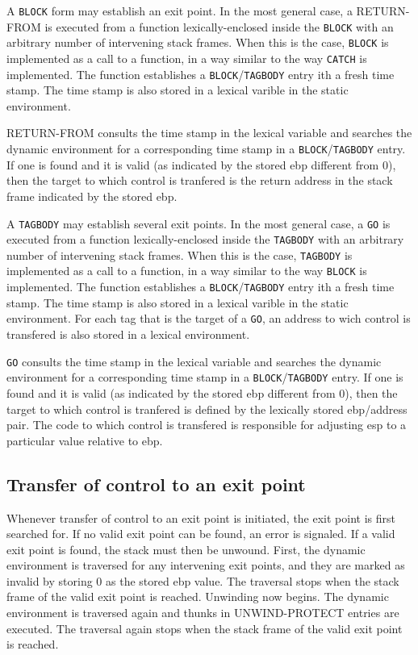 A \texttt{BLOCK} form may establish an exit point.  In the most
general case, a RETURN-FROM is executed from a function
lexically-enclosed inside the \texttt{BLOCK} with an arbitrary number
of intervening stack frames.  When this is the case, \texttt{BLOCK} is
implemented as a call to a function, in a way similar to the way
\texttt{CATCH} is implemented.  The function establishes a
\texttt{BLOCK}/\texttt{TAGBODY} entry ith a fresh time stamp.  The
time stamp is also stored in a lexical varible in the static
environment.

RETURN-FROM consults the time stamp in the lexical variable and
searches the dynamic environment for a corresponding time stamp in a
\texttt{BLOCK}/\texttt{TAGBODY} entry.  If one is found and it is
valid (as indicated by the stored ebp different from 0), then the
target to which control is tranfered is the return address in the
stack frame indicated by the stored ebp.

A \texttt{TAGBODY} may establish several exit points.  In the most
general case, a \texttt{GO} is executed from a function
lexically-enclosed inside the \texttt{TAGBODY} with an arbitrary
number of intervening stack frames.  When this is the case,
\texttt{TAGBODY} is implemented as a call to a function, in a way
similar to the way \texttt{BLOCK} is implemented.  The function
establishes a \texttt{BLOCK}/\texttt{TAGBODY} entry ith a fresh time
stamp.  The time stamp is also stored in a lexical varible in the
static environment.  For each tag that is the target of a \texttt{GO},
an address to wich control is transfered is also stored in a lexical
environment.

\texttt{GO} consults the time stamp in the lexical variable and
searches the dynamic environment for a corresponding time stamp in a
\texttt{BLOCK}/\texttt{TAGBODY} entry.  If one is found and it is
valid (as indicated by the stored ebp different from 0), then the
target to which control is tranfered is defined by the lexically
stored ebp/address pair.  The code to which control is transfered is
responsible for adjusting esp to a particular value relative to ebp.

\subsection{Transfer of control to an exit point}

Whenever transfer of control to an exit point is initiated, the exit
point is first searched for.  If no valid exit point can be found, an
error is signaled.  If a valid exit point is found, the stack must
then be unwound.  First, the dynamic environment is traversed for any
intervening exit points, and they are marked as invalid by storing 0
as the stored ebp value.  The traversal stops when the stack frame of
the valid exit point is reached.  Unwinding now begins.  The dynamic
environment is traversed again and thunks in UNWIND-PROTECT entries
are executed.  The traversal again stops when the stack frame of the
valid exit point is reached.

